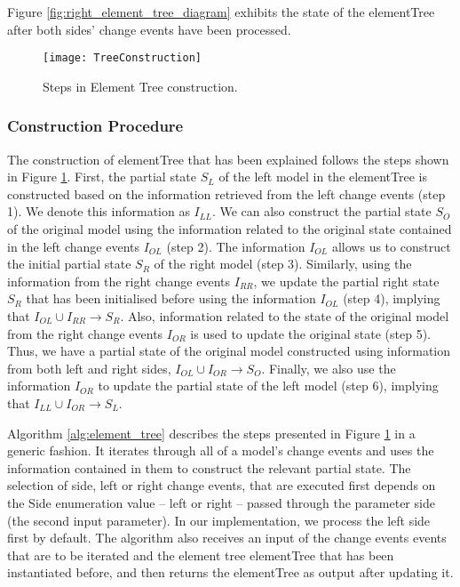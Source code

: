 Figure \ref{fig:right_element_tree_diagram} exhibits the state of the \textsf{elementTree} after both sides' change events have been processed.

\begin{figure}
    \centering
    \texttt{[image: TreeConstruction]}
    \caption{Steps in Element Tree construction.}
    \label{fig:tree_construction}
\end{figure} 

\subsubsection{Construction Procedure}\label{sec:construction_procedure}
The construction of \textsf{elementTree} that has been explained follows the steps shown in Figure \ref{fig:tree_construction}. First, the partial
state $S_{L}$ of the left model in the \textsf{elementTree} is constructed based on the information retrieved from the left change events (step 1). We denote this information as $I_{LL}$. We can also construct the partial 
state $S_{O}$ of the original model using the information related to the original state contained in the left change events $I_{OL}$ (step 2). The information $I_{OL}$ allows us to construct the initial partial 
state $S_{R}$ of the right model 
(step 3). Similarly, using the information from the right change events $I_{RR}$, we update the partial right state $S_{R}$ that has been initialised before using the information $I_{OL}$ (step 4), implying that $I_{OL} \cup I_{RR} \rightarrow S_{R}$. Also, information related to the state of the original model from the right change events $I_{OR}$ is used to update the original state  (step 5). Thus, we have a partial state of the original model constructed using information from both left and right sides, $I_{OL} \cup I_{OR} \rightarrow S_{O}$. Finally, we also use the information $I_{OR}$ to update the partial state of the left model (step 6), implying that $I_{LL} \cup I_{OR} \rightarrow S_{L}$.  

Algorithm \ref{alg:element_tree} describes the steps presented in Figure \ref{fig:tree_construction} in a generic fashion. It iterates through all of a model's change events and uses the information contained in them to construct the relevant partial state. The selection of side, left or right change events, that are executed first depends on the \textsf{Side} enumeration value -- \textsf{left} or \textsf{right} -- passed through the parameter \textsf{side} (the second input parameter). In our implementation, we process the left side first by default. The algorithm also receives an input of the change events \textsf{events} that are to be iterated and the element tree \textsf{elementTree} that has been instantiated before, and then returns the \textsf{elementTree} as output after updating it.

